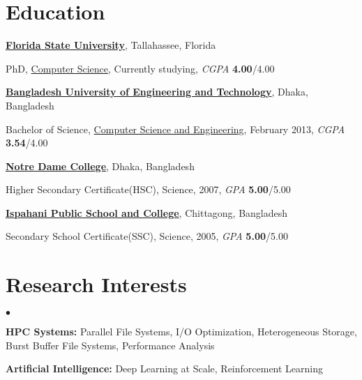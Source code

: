 \documentclass[margin,line]{res}
\newenvironment{list1}{
  \begin{list}{\ding{113}}{%
      \setlength{\itemsep}{0in}
      \setlength{\parsep}{0in} \setlength{\parskip}{0in}
      \setlength{\topsep}{0in} \setlength{\partopsep}{0in} 
      \setlength{\leftmargin}{0.17in}}}{\end{list}}
\newenvironment{list2}{
  \begin{list}{$\bullet$}{%
      \setlength{\itemsep}{0in}
      \setlength{\parsep}{0in} \setlength{\parskip}{0in}
      \setlength{\topsep}{0in} \setlength{\partopsep}{0in} 
      \setlength{\leftmargin}{0.2in}}}{\end{list}}
\begin{document}
\begin{resume}
\section{\sc Education}
{\bf \href{http://www.fsu.edu}{Florida State University}}, Tallahassee, Florida\\
\vspace*{-.15in}
\begin{list1}
\item[] PhD, \href{http://www.cs.fsu.edu/}{Computer Science}, Currently studying, \textit{CGPA} \textbf{4.00}/4.00
\end{list1}
\vspace*{-.15in}
{\bf \href{http://buet.ac.bd}{Bangladesh University of Engineering and Technology}}, Dhaka, Bangladesh\\
\vspace*{-.15in}
\begin{list1}
\item[] Bachelor of Science, \href{http://cse.buet.ac.bd}{Computer Science and Engineering}, February 2013, \textit{CGPA} \textbf{3.54}/4.00
\end{list1}
\vspace*{-.15in}
{\bf \href{http://www.notredamecollege-dhaka.com/}{Notre Dame College}}, Dhaka, Bangladesh\\
\vspace*{-.15in}
\begin{list1}
\item[] Higher Secondary Certificate(HSC), Science, 2007, \textit{GPA} \textbf{5.00}/5.00
\end{list1}
\vspace*{-.15in}
{\bf \href{http://www.ipscctg.edu.bd/}{Ispahani Public School and College}}, Chittagong, Bangladesh\\
\vspace*{-.15in}
\begin{list1}
\item[] Secondary School Certificate(SSC), Science, 2005, \textit{GPA} \textbf{5.00}/5.00
\end{list1}

\vspace*{-.1in}

\section{\sc Research Interests}
\begin{list2}
\item \textbf{HPC Systems:} Parallel File Systems, I/O Optimization, Heterogeneous Storage, Burst Buffer File Systems, Performance Analysis
\item \textbf{Artificial Intelligence:} Deep Learning at Scale, Reinforcement Learning
\end{list2}


\end{resume}
\end{document}
